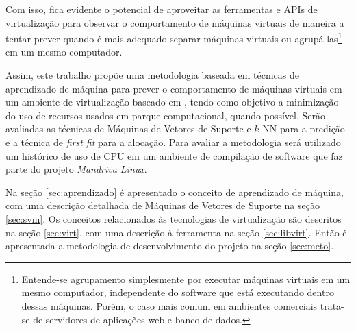 Com isso, fica evidente o potencial de aproveitar as ferramentas e APIs de
virtualização para observar o comportamento de máquinas virtuais de maneira
a tentar prever quando é mais adequado separar máquinas virtuais ou
agrupá-las\footnote{Entende-se agrupamento simplesmente por
executar máquinas virtuais em um mesmo computador, independente do software
que está executando dentro dessas máquinas. Porém, o caso mais comum em
ambientes comerciais trata-se de servidores de aplicações web e banco de
dados.} em um mesmo computador. 

Assim, este trabalho propõe uma metodologia baseada em técnicas de
aprendizado de máquina para prever o comportamento de máquinas
virtuais em um ambiente de virtualização baseado em \libvirt{}, tendo como
objetivo a minimização do uso de recursos usados em parque computacional,
quando possível. Serão avaliadas as técnicas de Máquinas de Vetores de
Suporte e $k$-NN para a predição e a técnica de \emph{first fit} para a
alocação. Para avaliar a metodologia será utilizado um histórico de uso de
CPU em um ambiente de compilação de software que faz parte do projeto
\emph{Mandriva Linux}.

Na seção \ref{sec:aprendizado} é apresentado o conceito de aprendizado de
máquina, com uma descrição detalhada de Máquinas de Vetores de Suporte na
seção \ref{sec:svm}. Os conceitos relacionados às tecnologias de
virtualização são descritos na seção \ref{sec:virt}, com uma descrição à
ferramenta \libvirt{} na seção \ref{sec:libvirt}. Então é apresentada a
metodologia de desenvolvimento do projeto na seção \ref{sec:meto}.
